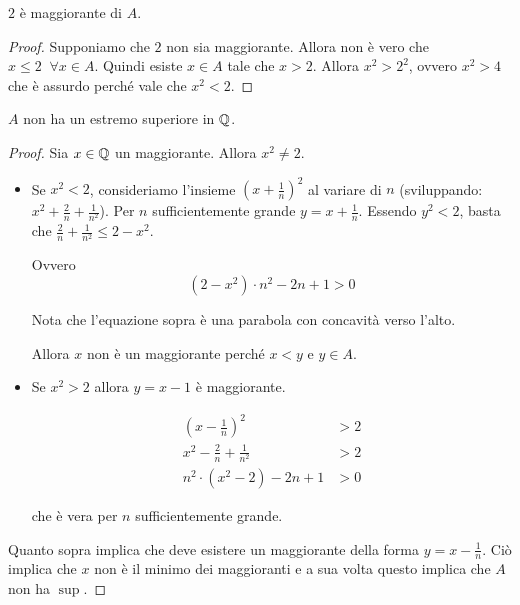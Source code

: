 \begin{proposition}
$2$ è maggiorante di $A$.
\end{proposition}
\begin{proof}
Supponiamo che $2$ non sia maggiorante. Allora non è vero che $x \le 2 \; \; \forall x \in A$. Quindi esiste $x \in A$ tale che $x > 2$. Allora $x^2 > 2^2$, ovvero $x^2 > 4$ che è assurdo perché vale che $x^2 < 2$.
\end{proof}
\begin{proposition}
$A$ non ha un estremo superiore in $\mathbb Q$.
\end{proposition}
\begin{proof}
Sia $x \in \mathbb Q$ un maggiorante. Allora $x^2 \neq 2$. 

\begin{itemize}
\item 
Se $x^2 < 2$, consideriamo l'insieme $(x+\frac{1}{n})^2$ al variare di $n$ (sviluppando: $x^2 + \frac{2}{n} + \frac{1}{n^2}$).
Per $n$ sufficientemente grande $y = x + \frac{1}{n}$. Essendo $y^2 < 2$, basta che $\frac{2}{n} + \frac{1}{n^2} \le 2 - x^2$.

Ovvero
\begin{equation*}
(2 - x^2) \cdot n^2 - 2n + 1 > 0 
\end{equation*} 

Nota che l'equazione sopra è una parabola con concavità verso l'alto. 

Allora $x$ non è un maggiorante perché $x < y$ e $y \in A$.

\item 
Se $x^2 > 2$ allora $y = x - 1$ è maggiorante.

\begin{align*}
(x-\frac{1}{n})^2 &> 2 \\
x^2 - \frac{2}{n} + \frac{1}{n^2} &> 2 \\
n^2 \cdot (x^2 - 2) - 2n + 1 &> 0
\end{align*}

che è vera per $n$ sufficientemente grande.

\end{itemize}

Quanto sopra implica che deve esistere un maggiorante della forma $y = x - \frac{1}{n}$. Ciò implica che $x$ non è il minimo dei maggioranti e a sua volta questo implica che $A$ non ha $\sup$.

\end{proof}

